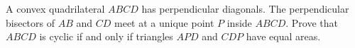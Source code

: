 A convex quadrilateral $ABCD$ has perpendicular diagonals. The perpendicular bisectors of $AB$ and $CD$ meet at a unique point $P$ inside $ABCD$. Prove that $ABCD$ is cyclic if and only if triangles $APD$ and $CDP$ have equal areas.
